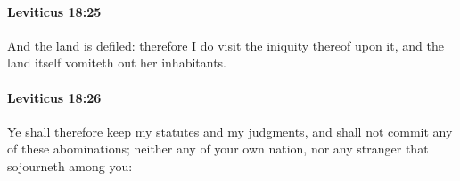 		\paragraph{Leviticus 18:25} %
			\label{LEVITICUS-18-25}

			And the land is defiled: therefore I do visit the iniquity thereof upon it, and the land itself vomiteth out her inhabitants.


		\paragraph{Leviticus 18:26} %
			\label{LEVITICUS-18-26}

			Ye shall therefore keep my statutes and my judgments, and shall not commit any of these abominations; neither any of your own nation, nor any stranger that sojourneth among you:


